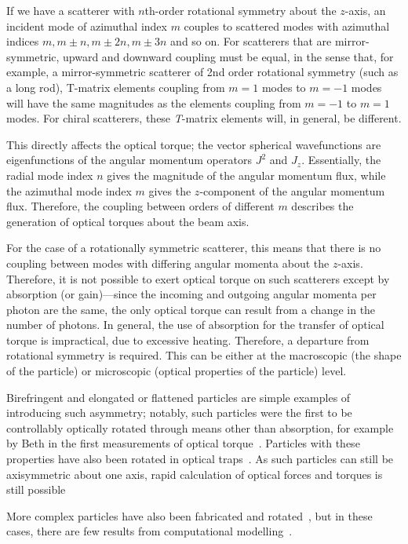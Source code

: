 \documentclass{article}
\begin{document}
If we have a scatterer with $n$th-order rotational symmetry about the
$z$-axis, an incident mode of azimuthal index $m$ couples to scattered
modes with azimuthal indices $m, m\pm n, m\pm 2n, m\pm 3n$ and so on. For
scatterers that are mirror-symmetric, upward and downward coupling must be
equal, in the sense that, for example, a mirror-symmetric scatterer of
2nd order rotational symmetry (such as a long rod), {T}-matrix elements
coupling from $m = 1$ modes to $m = -1$ modes will have the same magnitudes
as the elements coupling from $m = -1$ to $m = 1$ modes. For chiral
scatterers, these \textit{T}-matrix elements will, in general, be different.

This directly affects the optical torque; the vector spherical wavefunctions
are eigenfunctions of the angular momentum operators $J^2$ and $J_z$.
Essentially, the radial mode index $n$ gives the magnitude of the
angular momentum flux, while the azimuthal mode index $m$ gives
the $z$-component of the angular momentum flux. Therefore, the coupling
between orders of different $m$ describes the generation of optical
torques about the beam axis.

For the case of a rotationally symmetric scatterer, this means that there
is no coupling between modes with differing angular momenta about
the $z$-axis\cite{waterman1971,mishchenko1991,nieminen2004a}.
Therefore, it is not possible to exert optical torque on such scatterers
except by absorption (or gain)---since the incoming and outgoing
angular momenta
per photon are the same, the only optical torque can result from a change
in the number of photons. In general, the use of absorption for the
transfer of optical torque is impractical, due to excessive heating.
Therefore, a departure from rotational symmetry is required. This
can be either at the macroscopic (the shape of the particle) or
microscopic (optical properties of the particle) level.

Birefringent and elongated or flattened particles are simple
examples of introducing such asymmetry; notably, such particles were
the first to be controllably optically rotated through means other
than absorption, for example by Beth in the first measurements
of optical torque~\cite{beth1936}. Particles with these properties
have also been rotated in optical traps~\cite{friese1998nature,bonin2002,bayoudh2003,bishop2003}. As such particles can still
be axisymmetric about one axis, rapid calculation of optical
forces and torques is still possible~\cite{bayoudh2003,bishop2003}

More complex particles have also been fabricated and
rotated~\cite{galajda2001,luo2000,ukita2002}, but in these cases,
there are few results from computational modelling~\cite{collett2003}.
\end{document}
